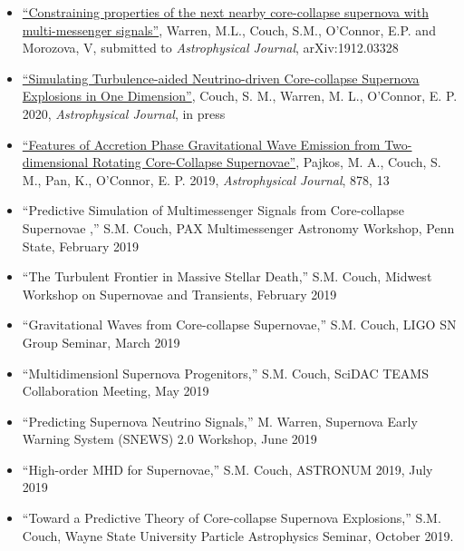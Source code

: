 \documentclass[12pt,titlepage]{article}
\begin{document}
\begin{itemize}
    \item \href{https://ui.adsabs.harvard.edu/abs/2019arXiv191203328W}{``Constraining properties of the next nearby core-collapse supernova with multi-messenger signals''}, {Warren}, M.L., {Couch}, S.M., {O'Connor}, E.P. and {Morozova}, V, submitted to {\itshape Astrophysical Journal}, arXiv:1912.03328
    \item \href{https://ui.adsabs.harvard.edu/#abs/2019arXiv190201340C/abstract}{``Simulating Turbulence-aided Neutrino-driven Core-collapse Supernova Explosions in One Dimension''}, Couch, S. M., Warren, M. L., O'Connor, E. P. 2020, {\itshape Astrophysical Journal}, in press 
    \item \href{https://ui.adsabs.harvard.edu/#abs/2019arXiv190109055P/abstract}{``Features of Accretion Phase Gravitational Wave Emission from Two-dimensional Rotating Core-Collapse Supernovae''}, Pajkos, M. A., Couch, S. M., Pan, K., O'Connor, E. P. 2019, {\itshape Astrophysical Journal}, 878, 13
\end{itemize}


\begin{itemize}
    \item  ``Predictive Simulation of Multimessenger Signals from Core-collapse Supernovae ,'' S.M. Couch, PAX Multimessenger Astronomy Workshop, Penn State, February 2019
    \item ``The Turbulent Frontier in Massive Stellar Death,'' S.M. Couch, Midwest Workshop on Supernovae and Transients, February 2019
    \item ``Gravitational Waves from Core-collapse Supernovae,'' S.M. Couch, LIGO SN Group Seminar, March 2019
    \item ``Multidimensionl Supernova Progenitors,'' S.M. Couch, SciDAC TEAMS Collaboration Meeting, May 2019
    \item ``Predicting Supernova Neutrino Signals,'' M. Warren, Supernova Early Warning System (SNEWS) 2.0 Workshop, June 2019
    \item ``High-order MHD for Supernovae,'' S.M. Couch, ASTRONUM 2019, July 2019
    \item ``Toward a Predictive Theory of Core-collapse Supernova Explosions,'' S.M. Couch, Wayne State University Particle Astrophysics Seminar, October 2019.
\end{itemize}

\end{document}
